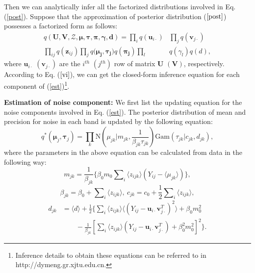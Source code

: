 \documentclass[journal]{IEEEtran}
\begin{document}
Then we can analytically infer all the factorized distributions involved in Eq. (\ref{post}). Suppose that the approximation of posterior distribution ($\ref{post}$) possesses a factorized form as follows:
\begin{equation}\label{est}
\begin{split}
q(\bm{U,V,\mathcal{Z},\mu,\tau,\pi,\gamma,d})=\prod_i{q(\bm{u}_{i \cdot})} &
\prod_j{q(\bm{v}_{j \cdot})} \\
\prod_{ij}{q(\bm{z}_{ij})}   \prod_j{q(\bm{\mu_j,\tau_j)}q(\bm{\pi_j})}  \prod_l&{q(\gamma_l)} q(d)   ,
\end{split}
\end{equation}
where $ \bm{u}_{i \cdot} $ $ (\bm{v}_{j \cdot} )$ are the $i^{th}$ $(j^{th})$ row of matrix $ \bm{U} $ $( \bm{V}) $, respectively. According to Eq. ($ \ref{vi} $), we can get the closed-form inference equation for each component of (\ref{est})\footnote{Inference details to obtain these equations can be referred to in http://dymeng.gr.xjtu.edu.cn.}.

\textbf{Estimation of noise component:} We first list the updating equation for the noise components involved in Eq. (\ref{est}). The posterior distribution of mean and precision for noise in each band is updated by the following equation:
\begin{equation}\label{mu,tau}
q^*(\bm{\mu}_j,\!\bm{\tau}_j)
\!=\! \prod_k\!{\mathrm{N}(\mu_{jk}|m_{jk},\!\frac{1}{\beta_{jk}\tau_{jk}}) \mathrm{Gam}(\tau_{jk}|c_{jk},d_{jk})},
\end{equation}
where the parameters in the above equation can be calculated from data in the following way:
\begin{equation}  \label{mutau1}
m_{jk} = \frac{1}{ \beta_{jk} } \{ \beta_0 m_0 \sum\nolimits_{i}{ \langle z_{ijk} \rangle (Y_{ij}- \langle \mu_{jk}  \rangle )} \},
\end{equation}
\begin{equation}\label{mutau2}
\beta_{jk} = \beta_0+ \sum\nolimits_{i}{ \langle z_{ijk} \rangle },~
c_{jk} = c_0 + \frac{1}{2}\sum\nolimits_{i}{ \langle z_{ijk} \rangle },
\end{equation}
\begin{equation} \label{mutau3}
\begin{split}
d_{jk}  &=  \langle d \rangle + \frac{1}{2} \{ \sum\nolimits_{i}{\langle z_{ijk} \rangle  \langle (Y_{ij}- \bm{u}_{i\cdot}\bm{v}_{j\cdot}^T)^2 \rangle}  +\beta_0m_0^2 \\
&\qquad - \frac{1}{\beta_{jk}} [ \sum\nolimits_{i}{ \langle z_{ijk} \rangle (Y_{ij}- \bm{u}_{i\cdot}\bm{v}_{j\cdot}^T )} + \beta_0^2m_0^2 ]^2 \}.
\end{split}
\end{equation}
\end{document}
